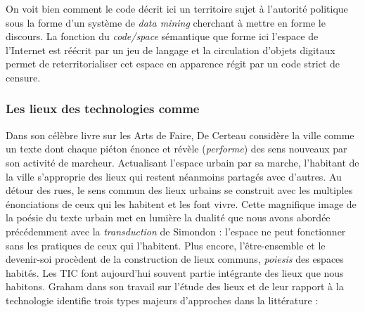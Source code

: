 On voit bien comment le code décrit ici un territoire sujet à l’autorité politique sous la forme d’un système de \textit{data mining} cherchant à mettre en forme le discours. La fonction du \textit{code/space} sémantique que forme ici l’espace de l’Internet est réécrit par un jeu de langage et la circulation d’objets digitaux permet de reterritorialiser cet espace en apparence régit par un code strict de censure. 

\subsubsection{Les lieux des technologies comme }
Dans son célèbre livre sur les Arts de Faire, De Certeau \citep{Certeau1980} considère la ville comme un texte dont chaque piéton énonce et révèle (\textit{performe}) des sens nouveaux par son activité de marcheur. Actualisant l’espace urbain par sa marche, l’habitant de la ville s’approprie des lieux qui restent néanmoins partagés avec d’autres. Au détour des rues, le sens commun des lieux urbains se construit avec les multiples énonciations de ceux qui les habitent et les font vivre. Cette magnifique image de la poésie du texte urbain met en lumière la dualité que nous avons abordée précédemment avec la \textit{transduction} de Simondon : l’espace ne peut fonctionner sans les pratiques de ceux qui l’habitent. Plus encore, l’être-ensemble et le devenir-soi procèdent de la construction de lieux communs, \textit{poiesis} des espaces habités. Les TIC font aujourd’hui souvent partie intégrante des lieux que nous habitons. Graham \citep{Graham1998} dans son travail sur l’étude des lieux et de leur rapport à la technologie identifie trois types majeurs d’approches dans la littérature :


